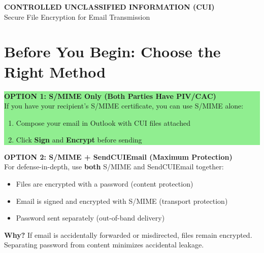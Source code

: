 \documentclass[11pt,letterpaper]{article}
\begin{document}
\begin{center}
\colorbox{cuiyellow}{\parbox{0.9\textwidth}{\centering\large\textbf{CONTROLLED UNCLASSIFIED INFORMATION (CUI)}\\[3pt]Secure File Encryption for Email Transmission}}
\end{center}

\vspace{-0.1in}

\section*{Before You Begin: Choose the Right Method}

\colorbox{lightgreen}{\parbox{\dimexpr\textwidth-2\fboxsep}{
\textbf{OPTION 1: S/MIME Only (Both Parties Have PIV/CAC)}\\[3pt]
If you have your recipient's S/MIME certificate, you can use S/MIME alone:
\begin{enumerate}[leftmargin=0.3in, topsep=2pt, itemsep=0pt]
    \item Compose your email in Outlook with CUI files attached
    \item Click \textbf{Sign} and \textbf{Encrypt} before sending
\end{enumerate}
}}

\vspace{6pt}

\colorbox{cuiyellow}{\parbox{\dimexpr\textwidth-2\fboxsep}{
\textbf{OPTION 2: S/MIME + SendCUIEmail (Maximum Protection)}\\[3pt]
For defense-in-depth, use \textbf{both} S/MIME and SendCUIEmail together:
\begin{itemize}[leftmargin=0.3in, topsep=2pt, itemsep=0pt]
    \item Files are encrypted with a password (content protection)
    \item Email is signed and encrypted with S/MIME (transport protection)
    \item Password sent separately (out-of-band delivery)
\end{itemize}
\textbf{Why?} If email is accidentally forwarded or misdirected, files remain encrypted. Separating password from content minimizes accidental leakage.
}}

\vspace{6pt}
\end{document}
